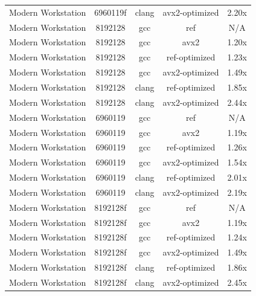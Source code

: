 \begin{table}[H]
\begin{tabularx}{\linewidth}{X c c c c}
          Modern Workstation &             6960119f &                clang &       avx2-optimized &                2.20x\\
          Modern Workstation &              8192128 &                  gcc &                  ref &                  N/A\\
          Modern Workstation &              8192128 &                  gcc &                 avx2 &                1.20x\\
          Modern Workstation &              8192128 &                  gcc &        ref-optimized &                1.23x\\
          Modern Workstation &              8192128 &                  gcc &       avx2-optimized &                1.49x\\
          Modern Workstation &              8192128 &                clang &        ref-optimized &                1.85x\\
          Modern Workstation &              8192128 &                clang &       avx2-optimized &                2.44x\\
          Modern Workstation &              6960119 &                  gcc &                  ref &                  N/A\\
          Modern Workstation &              6960119 &                  gcc &                 avx2 &                1.19x\\
          Modern Workstation &              6960119 &                  gcc &        ref-optimized &                1.26x\\
          Modern Workstation &              6960119 &                  gcc &       avx2-optimized &                1.54x\\
          Modern Workstation &              6960119 &                clang &        ref-optimized &                2.01x\\
          Modern Workstation &              6960119 &                clang &       avx2-optimized &                2.19x\\
          Modern Workstation &             8192128f &                  gcc &                  ref &                  N/A\\
          Modern Workstation &             8192128f &                  gcc &                 avx2 &                1.19x\\
          Modern Workstation &             8192128f &                  gcc &        ref-optimized &                1.24x\\
          Modern Workstation &             8192128f &                  gcc &       avx2-optimized &                1.49x\\
          Modern Workstation &             8192128f &                clang &        ref-optimized &                1.86x\\
          Modern Workstation &             8192128f &                clang &       avx2-optimized &                2.45x\\
        \bottomrule
    \end{tabularx}
\end{table}


